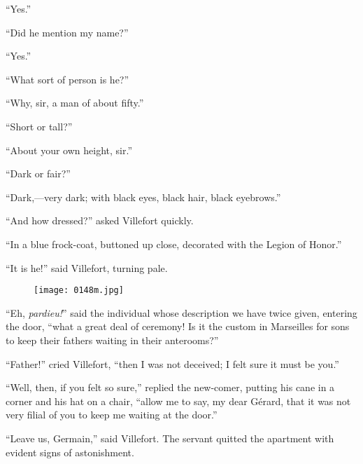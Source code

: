 “Yes.”

“Did he mention my name?”

“Yes.”

“What sort of person is he?”

“Why, sir, a man of about fifty.”

“Short or tall?”

“About your own height, sir.”

“Dark or fair?”

“Dark,—very dark; with black eyes, black hair, black eyebrows.”

“And how dressed?” asked Villefort quickly.

“In a blue frock-coat, buttoned up close, decorated with the Legion of
Honor.”

“It is he!” said Villefort, turning pale.

\begin{figure}[h]
\texttt{[image: 0148m.jpg]}
\end{figure}

“Eh, \textit{pardieu!}” said the individual whose description we have twice
given, entering the door, “what a great deal of ceremony! Is it the
custom in Marseilles for sons to keep their fathers waiting in their
anterooms?”

“Father!” cried Villefort, “then I was not deceived; I felt sure it
must be you.”

“Well, then, if you felt so sure,” replied the new-comer, putting his
cane in a corner and his hat on a chair, “allow me to say, my dear
Gérard, that it was not very filial of you to keep me waiting at the
door.”

“Leave us, Germain,” said Villefort. The servant quitted the apartment
with evident signs of astonishment.
